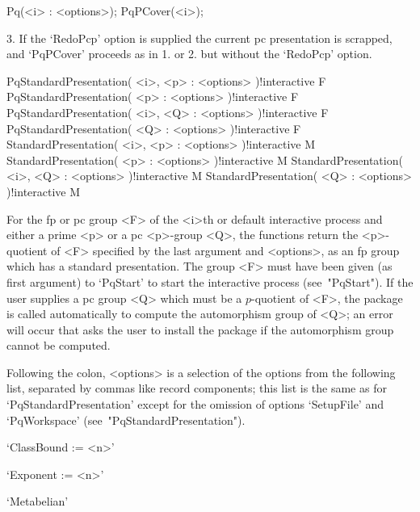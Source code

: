 Pq(<i> : <options>);
PqPCover(<i>);

\item{3.}
If the `RedoPcp' option  is  supplied  the  current  pc  presentation  is
scrapped, and `PqPCover'  proceeds  as  in  1.  or  2.  but  without  the
`RedoPcp' option.

\endlist

\>PqStandardPresentation( <i>, <p> : <options> )!{interactive} F
\>PqStandardPresentation( <p> : <options> )!{interactive} F
\>PqStandardPresentation( <i>, <Q> : <options> )!{interactive} F
\>PqStandardPresentation( <Q> : <options> )!{interactive} F
\>StandardPresentation( <i>, <p> : <options> )!{interactive} M
\>StandardPresentation( <p> : <options> )!{interactive} M
\>StandardPresentation( <i>, <Q> : <options> )!{interactive} M
\>StandardPresentation( <Q> : <options> )!{interactive} M

For the fp or pc group <F> of the <i>th or default  interactive  {\ANUPQ}
process and either a prime <p> or  a  pc  <p>-group  <Q>,  the  functions
return the <p>-quotient  of  <F>  specified  by  the  last  argument  and
<options>, as an fp group which has a standard  presentation.  The  group
<F> must have been given (as first argument) to `PqStart'  to  start  the
interactive {\ANUPQ} process (see~"PqStart"). If the user supplies  a  pc
group <Q> which must be a $p$-quotient of <F>, the package {\AutPGrp}  is
called automatically to compute the automorphism group of <Q>;  an  error
will occur that asks the user to install the package  {\AutPGrp}  if  the
automorphism group cannot be computed.

Following the colon, <options> is a selection of  the  options  from  the
following list, separated by commas like record components; this list  is
the same as for  `PqStandardPresentation'  except  for  the  omission  of
options `SetupFile' and `PqWorkspace' (see~"PqStandardPresentation").

\beginlist%

\item{}`ClassBound := <n>'

\item{}`Exponent := <n>'

\item{}`Metabelian'

